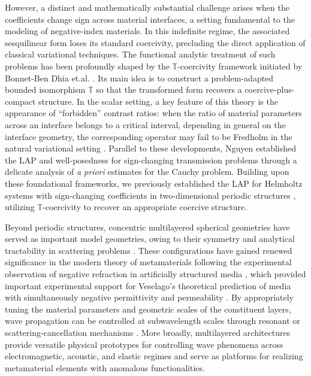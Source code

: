 \documentclass[12pt,reqno]{amsart}
\numberwithin{equation}{section}
\begin{document}
However, a distinct and mathematically substantial challenge arises when the coefficients change sign across material interfaces, a setting fundamental to the modeling of negative-index materials. In this indefinite regime, the associated sesquilinear form loses its standard coercivity, precluding the direct application of classical variational techniques. The functional analytic treatment of such problems has been profoundly shaped by the $\mathbb{T}$-coercivity framework initiated by Bonnet-Ben Dhia et.al. \cite{MR2644187, Bonnet2012, MR3200087}. Its main idea is to construct a problem-adapted bounded isomorphism \(\mathbb{T}\) so that the transformed form recovers a coercive-plus-compact structure. In the scalar setting, a key feature of this theory is the appearance of ``forbidden'' contrast ratios: when the ratio of material parameters across an interface belongs to a critical interval, depending in general on the interface geometry, the corresponding operator may fail to be Fredholm in the natural variational setting \cite{Bonnet2012}. Parallel to these developments, Nguyen \cite{MR3515306} established the LAP and well-posedness for sign-changing transmission problems through a delicate analysis of \textit{a priori} estimates for the Cauchy problem. Building upon these foundational frameworks, we previously established the LAP for Helmholtz systems with sign-changing coefficients in two-dimensional periodic structures \cite{MR5002626}, utilizing $\mathbb{T}$-coercivity to recover an appropriate coercive structure.


Beyond periodic structures, concentric multilayered spherical geometries have served as important model geometries, owing to their symmetry and analytical tractability in scattering problems \cite{CHEN20155, ZHU2020, Johnson96}. These configurations have gained renewed significance in the modern theory of metamaterials following the experimental observation of negative refraction in artificially structured media \cite{shelby2001}, which provided important experimental support for Veselago's theoretical prediction of media with simultaneously negative permittivity and permeability \cite{Veselago1968}. By appropriately tuning the material parameters and geometric scales of the constituent layers, wave propagation can be controlled at subwavelength scales through resonant or scattering-cancellation mechanisms \cite{DENG2026, PhysRevLett.100.113901}. More broadly, multilayered architectures provide versatile physical prototypes for controlling wave phenomena across electromagnetic, acoustic, and elastic regimes \cite{DENG2026, PhysRevLett.301, PhysRevLett.100.113901, PhysRevLett.108} and serve as platforms for realizing metamaterial elements with anomalous functionalities.
\end{document}
